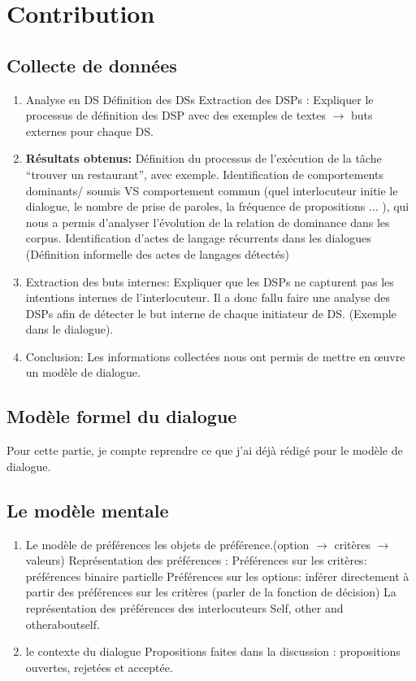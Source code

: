 \documentclass[a4paper,french]{article}
\begin{document}
\section{Contribution}
\label{contribution}
\par 
\subsection{Collecte de données}
\begin{enumerate}
	\item Analyse en DS
	\subitem Définition des DSs \cite{grosz1986attention}
	\subitem Extraction des DSPs : Expliquer le processus de définition des DSP avec des exemples de textes $\rightarrow$ buts externes pour chaque DS.
	\item \textbf{Résultats obtenus:}
		\subitem Définition du processus de l’exécution de la tâche ``trouver un restaurant'', avec exemple. 
		\subitem Identification de comportements dominants/ soumis VS comportement commun (quel interlocuteur initie le dialogue, le nombre de prise de paroles, la fréquence de propositions ... ), qui nous a permis d'analyser l'évolution de la relation de dominance dans les corpus. 
		\subitem Identification d'actes de langage récurrents dans les dialogues (Définition informelle des actes de langages détectés)
	\item Extraction des buts internes: Expliquer que les DSPs ne capturent pas les intentions internes de l'interlocuteur. Il a donc fallu faire une analyse des DSPs afin de détecter le but interne de chaque initiateur de DS. (Exemple dans le dialogue).
	\item Conclusion: Les informations collectées nous ont permis de mettre en œuvre un modèle de dialogue. 
	
	
\end{enumerate}
\subsection{Modèle formel du dialogue}
\par Pour cette partie, je compte reprendre ce que j'ai déjà rédigé pour le modèle de dialogue. 
\subsection{Le modèle mentale}
\begin{enumerate}
\item Le modèle de préférences
 	\subitem les objets de préférence.(option $\rightarrow$ critères $\rightarrow$ valeurs)
 	\subitem Représentation des préférences :
 			\subsubitem Préférences sur les critères: préférences binaire partielle
 			\subsubitem Préférences sur les options: inférer directement à partir des préférences sur les critères (parler de la fonction de décision)
 	\subitem La représentation des préférences des interlocuteurs
 			\subsubitem Self, other and otheraboutself.
\item le contexte du dialogue
 			\subitem Propositions faites dans la discussion : propositions ouvertes, rejetées et acceptée. 	
\end{enumerate}
\end{document}
